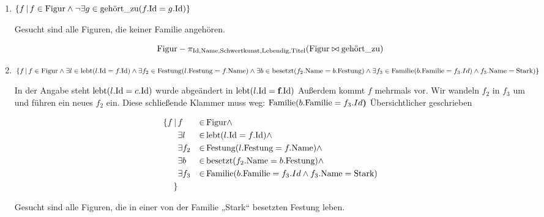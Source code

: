 \documentclass{bschlangaul-aufgabe}
\begin{document}
\begin{enumerate}


\item $\{ f \, | \, f \in \text{Figur} \land \neg \exists g \in \text{gehört\_zu}(f.\text{Id} = g.\text{Id})\}$

\begin{bAntwort}
Gesucht sind alle Figuren, die keiner Familie angehören.

\begin{displaymath}
\text{Figur} - \pi_{\text{Id}, \text{Name}, \text{Schwertkunst}, \text{Lebendig}, \text{Titel}}(\text{Figur} \bowtie \text{gehört\_zu})
\end{displaymath}
\end{bAntwort}


\item $\{ f \, | \,
  f \in \text{Figur} \land
  \exists l \in \text{lebt}(l.\text{Id} = f.\text{Id}) \land
  \exists f_2 \in \text{Festung}(l.\text{Festung} = f.\text{Name}) \land
  \exists b \in \text{besetzt}(f_2.\text{Name} = b.\text{Festung}) \land
  \exists f_3 \in \text{Familie}(b.\text{Familie} = f_3.Id) \land
  f_3.\text{Name} = \text{Stark})
\}$

\begin{bAntwort}
In der Angabe steht $\text{lebt}(l.\text{Id} = c.\text{Id})$ wurde abgeändert in
$\text{lebt}(l.\text{Id} = \textbf{f}.\text{Id})$ Außerdem kommt $f$ mehrmals
vor. Wir wandeln $f_2$ in $f_3$ um und führen ein neues $f_2$ ein. Diese
schließende Klammer muss weg: $\text{Familie}(b.\text{Familie} =
f_3.Id\textbf{)}$ Übersichtlicher geschrieben

\begin{align*}
\{ f \, | \,
  & f                 & \in & \, \text{Figur} \land \\
  & \exists l   & \in & \, \text{lebt}(l.\text{Id} = f.\text{Id}) \land \\
  & \exists f_2 & \in & \, \text{Festung}(l.\text{Festung} = f.\text{Name})\land \\
  & \exists b   & \in & \, \text{besetzt}(f_2.\text{Name} = b.\text{Festung}) \land \\
  & \exists f_3 & \in & \,\text{Familie}(b.\text{Familie} = f_3.Id \land f_3.\text{Name} = \text{Stark})\\
\}
\end{align*}

Gesucht sind alle Figuren, die in einer von der Familie „Stark“
besetzten Festung leben.
\end{bAntwort}
\end{enumerate}
\end{document}
